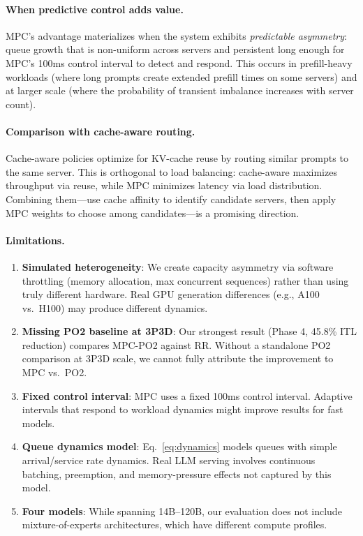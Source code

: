 \documentclass[runningheads]{llncs}
\begin{document}
\paragraph{When predictive control adds value.} MPC's advantage materializes when the system exhibits \textit{predictable asymmetry}: queue growth that is non-uniform across servers and persistent long enough for MPC's 100ms control interval to detect and respond. This occurs in prefill-heavy workloads (where long prompts create extended prefill times on some servers) and at larger scale (where the probability of transient imbalance increases with server count).

\paragraph{Comparison with cache-aware routing.} Cache-aware policies optimize for KV-cache reuse by routing similar prompts to the same server. This is orthogonal to load balancing: cache-aware maximizes throughput via reuse, while MPC minimizes latency via load distribution. Combining them---use cache affinity to identify candidate servers, then apply MPC weights to choose among candidates---is a promising direction.

\paragraph{Limitations.}
\begin{enumerate}
    \item \textbf{Simulated heterogeneity}: We create capacity asymmetry via software throttling (memory allocation, max concurrent sequences) rather than using truly different hardware. Real GPU generation differences (e.g., A100 vs.\ H100) may produce different dynamics.
    
    \item \textbf{Missing PO2 baseline at 3P3D}: Our strongest result (Phase 4, 45.8\% ITL reduction) compares MPC-PO2 against RR. Without a standalone PO2 comparison at 3P3D scale, we cannot fully attribute the improvement to MPC vs.\ PO2.
    
    \item \textbf{Fixed control interval}: MPC uses a fixed 100ms control interval. Adaptive intervals that respond to workload dynamics might improve results for fast models.
    
    \item \textbf{Queue dynamics model}: Eq.~\eqref{eq:dynamics} models queues with simple arrival/service rate dynamics. Real LLM serving involves continuous batching, preemption, and memory-pressure effects not captured by this model.
    
    \item \textbf{Four models}: While spanning 14B--120B, our evaluation does not include mixture-of-experts architectures, which have different compute profiles.
\end{enumerate}
\end{document}
